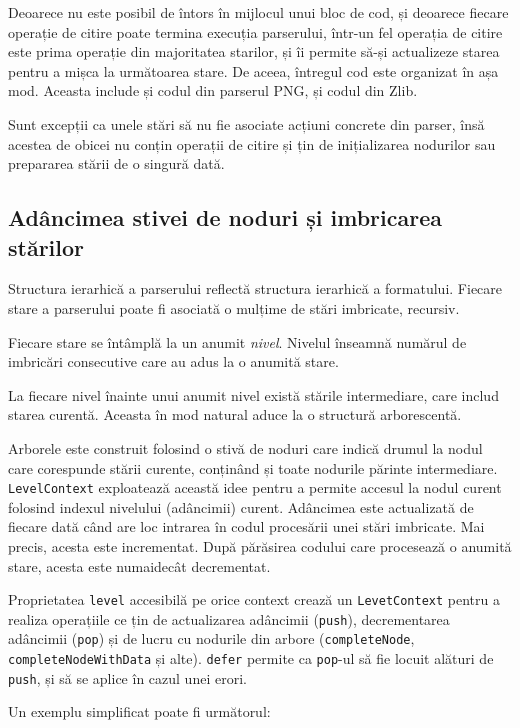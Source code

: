 \documentclass[a4paper,12pt]{report}
\begin{document}
Deoarece nu este posibil de întors în mijlocul unui bloc de cod,
și deoarece fiecare operație de citire poate termina execuția parserului,
într-un fel operația de citire este prima operație din majoritatea starilor,
și îi permite să-și actualizeze starea pentru a mișca la următoarea stare.
De aceea, întregul cod este organizat în așa mod.
Aceasta include și codul din parserul \ac{PNG}, și codul din Zlib.

Sunt excepții ca unele stări să nu fie asociate acțiuni concrete din parser,
însă acestea de obicei nu conțin operații de citire și țin de inițializarea nodurilor
sau prepararea stării de o singură dată.

\subsection{Adâncimea stivei de noduri și imbricarea stărilor}

Structura ierarhică a parserului reflectă structura ierarhică a formatului.
Fiecare stare a parserului poate fi asociată o mulțime de stări imbricate, recursiv.

Fiecare stare se întâmplă la un anumit \textit{nivel}. 
Nivelul înseamnă numărul de imbricări consecutive care au adus la o anumită stare.

La fiecare nivel înainte unui anumit nivel există stările intermediare, care includ starea curentă.
Aceasta în mod natural aduce la o structură arborescentă.

Arborele este construit folosind o stivă de noduri care
indică drumul la nodul care corespunde stării curente,
conținând și toate nodurile părinte intermediare.
\texttt{LevelContext} exploatează această idee pentru a permite accesul la
nodul curent folosind indexul nivelului (adâncimii) curent.
Adâncimea este actualizată de fiecare dată când are loc intrarea în codul procesării unei stări imbricate.
Mai precis, acesta este incrementat.
După părăsirea codului care procesează o anumită stare, acesta este numaidecât decrementat.

Proprietatea \texttt{level} accesibilă pe orice context crează un \texttt{LevetContext}
pentru a realiza operațiile ce țin de actualizarea adâncimii (\texttt{push}),
decrementarea adâncimii (\texttt{pop}) și de lucru cu nodurile
din arbore (\texttt{completeNode}, \texttt{completeNodeWithData} și alte).
\texttt{defer} permite ca \texttt{pop}-ul să fie locuit alături de \texttt{push},
și să se aplice în cazul unei erori. 

Un exemplu simplificat poate fi următorul:
\end{document}
